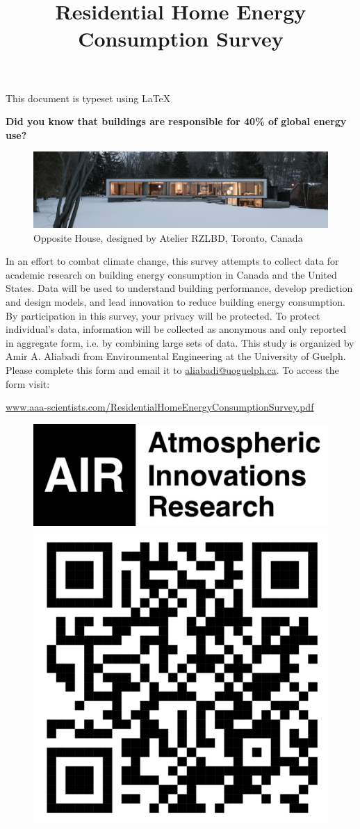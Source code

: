 \documentclass[12pt]{article}
\title{Residential Home Energy Consumption Survey}
\begin{document}
\maketitle

\begin{center}
This document is typeset using \LaTeX

\large
\textbf{Did you know that buildings are responsible for 40\% of global energy use?}
\normalsize
\end{center}

\begin{figure}[H]
\begin{center}
\includegraphics[width=\textwidth]{Figures/OppositeHouseNarrow.png} 
\caption{Opposite House, designed by Atelier RZLBD, Toronto, Canada}
\label{OppositeHouseNarrow}
\vspace{-0.5cm}
\end{center}
\end{figure}

In an effort to combat climate change, this survey attempts to collect data for academic research on building energy consumption in Canada and the United States. Data will be used to understand building performance, develop prediction and design models, and lead innovation to reduce building energy consumption. By participation in this survey, your privacy will be protected. To protect individual's data, information will be collected as anonymous and only reported in aggregate form, i.e. by combining large sets of data. This study is organized by Amir A. Aliabadi from Environmental Engineering at the University of Guelph. Please complete this form and email it to \href{mailto:aliabadi@uoguelph.ca}{aliabadi@uoguelph.ca}. To access the form visit: 

\url{www.aaa-scientists.com/ResidentialHomeEnergyConsumptionSurvey.pdf}

\begin{figure}
\includegraphics[height=0.1\textwidth]{Figures/AIR Logo Text}
\includegraphics[height=0.1\textwidth]{Figures/qrcode_42723388_365d17d4489069d364e3c3dad5b734c8}
\end{figure}
\end{document}
